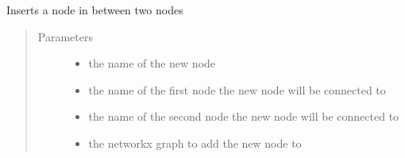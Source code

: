 \documentclass[letterpaper,10pt,english]{sphinxmanual}
\begin{document}
\begin{fulllineitems}
\label{\detokenize{source/yawning_titan.envs.generic.core:yawning_titan.envs.generic.core.network_interface.insert_node_between}}
\sphinxAtStartPar
Inserts a node in between two nodes
\begin{quote}\begin{description}
\item[{Parameters}] \leavevmode\begin{itemize}
\item {}
\sphinxAtStartPar
{} \textendash{} the name of the new node

\item {}
\sphinxAtStartPar
{} \textendash{} the name of the first node the new node will be connected to

\item {}
\sphinxAtStartPar
{} \textendash{} the name of the second node the new node will be connected to

\item {}
\sphinxAtStartPar
{} \textendash{} the networkx graph to add the new node to

\end{itemize}

\end{description}\end{quote}

\end{fulllineitems}

\end{document}
